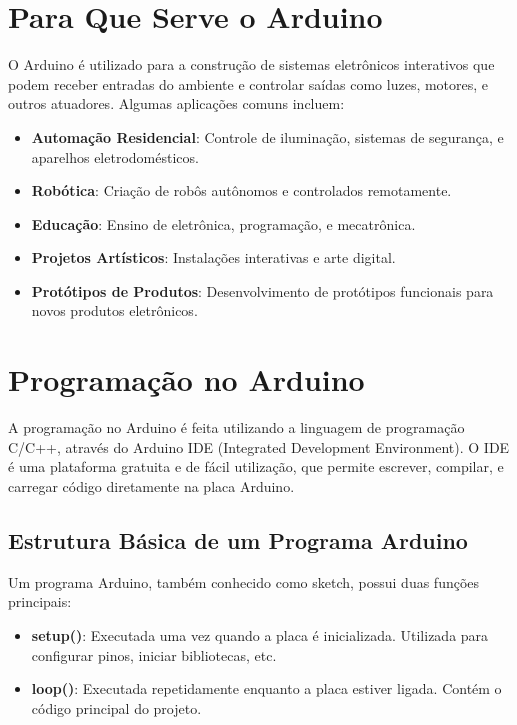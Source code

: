 \documentclass[
]{book}
\providecommand{\tightlist}{%
  \setlength{\itemsep}{0pt}\setlength{\parskip}{0pt}}
\begin{document}
\section{Para Que Serve o Arduino}\label{para-que-serve-o-arduino}

O Arduino é utilizado para a construção de sistemas eletrônicos interativos que podem receber entradas do ambiente e controlar saídas como luzes, motores, e outros atuadores. Algumas aplicações comuns incluem:

\begin{itemize}
\tightlist
\item
  \textbf{Automação Residencial}: Controle de iluminação, sistemas de segurança, e aparelhos eletrodomésticos.
\item
  \textbf{Robótica}: Criação de robôs autônomos e controlados remotamente.
\item
  \textbf{Educação}: Ensino de eletrônica, programação, e mecatrônica.
\item
  \textbf{Projetos Artísticos}: Instalações interativas e arte digital.
\item
  \textbf{Protótipos de Produtos}: Desenvolvimento de protótipos funcionais para novos produtos eletrônicos.
\end{itemize}

\section{Programação no Arduino}\label{programauxe7uxe3o-no-arduino}

A programação no Arduino é feita utilizando a linguagem de programação C/C++, através do Arduino IDE (Integrated Development Environment). O IDE é uma plataforma gratuita e de fácil utilização, que permite escrever, compilar, e carregar código diretamente na placa Arduino.

\subsection{Estrutura Básica de um Programa Arduino}\label{estrutura-buxe1sica-de-um-programa-arduino}

Um programa Arduino, também conhecido como sketch, possui duas funções principais:

\begin{itemize}
\tightlist
\item
  \textbf{setup()}: Executada uma vez quando a placa é inicializada. Utilizada para configurar pinos, iniciar bibliotecas, etc.
\item
  \textbf{loop()}: Executada repetidamente enquanto a placa estiver ligada. Contém o código principal do projeto.
\end{itemize}
\end{document}
